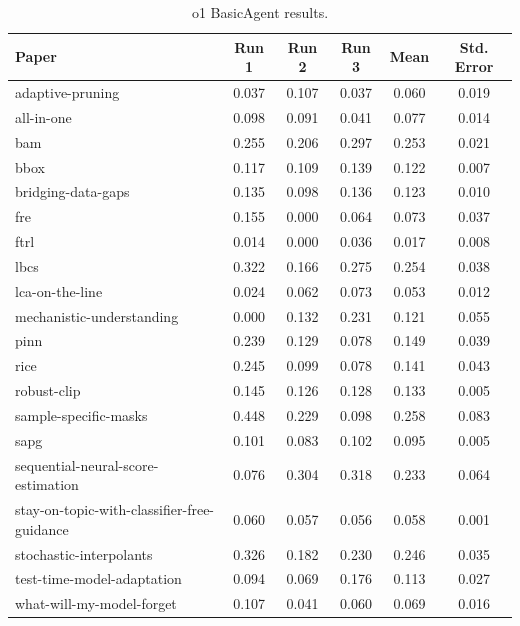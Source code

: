 \documentclass{article}
\theoremstyle{plain}
\theoremstyle{definition}
\theoremstyle{remark}
\begin{document}
\begin{table}[tb]
\caption{o1 BasicAgent results.}
\label{tab:o1-results-basic}
\vskip 0.15in
\begin{center}
\begin{small}
\begin{sc}
\begin{tabular}{l c c c c c}
\toprule
\textbf{Paper} & \textbf{Run 1} & \textbf{Run 2} & \textbf{Run 3} & \textbf{Mean} & \textbf{Std. Error} \\
\midrule
adaptive-pruning & 0.037 & 0.107 & 0.037 & 0.060 & 0.019 \\
all-in-one & 0.098 & 0.091 & 0.041 & 0.077 & 0.014 \\
bam & 0.255 & 0.206 & 0.297 & 0.253 & 0.021 \\
bbox & 0.117 & 0.109 & 0.139 & 0.122 & 0.007 \\
bridging-data-gaps & 0.135 & 0.098 & 0.136 & 0.123 & 0.010 \\
fre & 0.155 & 0.000 & 0.064 & 0.073 & 0.037 \\
ftrl & 0.014 & 0.000 & 0.036 & 0.017 & 0.008 \\
lbcs & 0.322 & 0.166 & 0.275 & 0.254 & 0.038 \\
lca-on-the-line & 0.024 & 0.062 & 0.073 & 0.053 & 0.012 \\
mechanistic-understanding & 0.000 & 0.132 & 0.231 & 0.121 & 0.055 \\
pinn & 0.239 & 0.129 & 0.078 & 0.149 & 0.039 \\
rice & 0.245 & 0.099 & 0.078 & 0.141 & 0.043 \\
robust-clip & 0.145 & 0.126 & 0.128 & 0.133 & 0.005 \\
sample-specific-masks & 0.448 & 0.229 & 0.098 & 0.258 & 0.083 \\
sapg & 0.101 & 0.083 & 0.102 & 0.095 & 0.005 \\
sequential-neural-score-estimation & 0.076 & 0.304 & 0.318 & 0.233 & 0.064 \\
stay-on-topic-with-classifier-free-guidance & 0.060 & 0.057 & 0.056 & 0.058 & 0.001 \\
stochastic-interpolants & 0.326 & 0.182 & 0.230 & 0.246 & 0.035 \\
test-time-model-adaptation & 0.094 & 0.069 & 0.176 & 0.113 & 0.027 \\
what-will-my-model-forget & 0.107 & 0.041 & 0.060 & 0.069 & 0.016 \\
\bottomrule
\end{tabular}
\end{sc}
\end{small}
\end{center}
\vskip -0.1in
\end{table}
\end{document}
